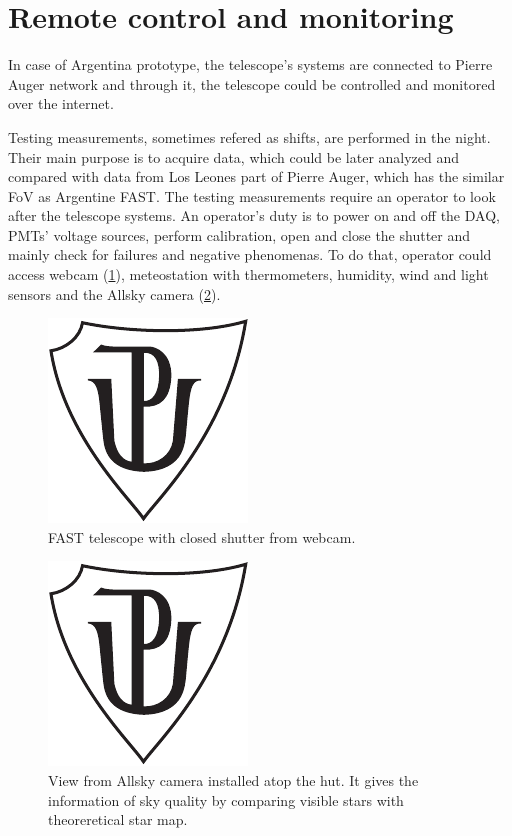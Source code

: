 \section{Remote control and monitoring}
In case of Argentina prototype, the telescope's systems are connected to Pierre Auger network and through it, the telescope could be controlled and monitored over the internet. 

\par
Testing measurements, sometimes refered as shifts, are performed in the night. Their main purpose is to acquire data, which could be later analyzed and compared with data from Los Leones part of Pierre Auger, which has the similar FoV as Argentine FAST. 
The testing measurements require an operator to look after the telescope systems. An operator's duty is to power on and off the DAQ, PMTs' voltage sources, perform calibration, open and close the shutter and mainly check for failures and negative phenomenas. To do that, operator could access webcam (\ref{FASTCam}), meteostation with thermometers, humidity, wind and light sensors and the Allsky camera (\ref{AllskyCam}).

\begin{figure}[H]
 \centering
 \includegraphics{up_logo_bw}
 \caption{FAST telescope with closed shutter from webcam.}
 \label{FASTCam}
 
\end{figure}

\begin{figure}[H]
 \centering
 \includegraphics{up_logo_bw}
 \caption{View from Allsky camera installed atop the hut. It gives the information of sky quality by comparing visible stars with theoreretical star map.}
 \label{AllskyCam}
 
\end{figure}



\section{}



